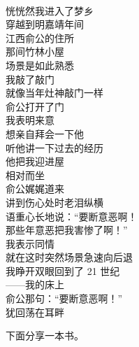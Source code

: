\begin{poem}[梦遇俞公记]
    \begin{multicols}{3}
        \begin{center}~\\
            恍恍然我进入了梦乡 \\ 穿越到明嘉靖年间 \\ 江西俞公的住所 \\ 那间竹林小屋 \\ 场景是如此熟悉 \\ 我敲了敲门 \\ 就像当年灶神敲门一样 \\ 俞公打开了门 \\ 我表明来意 \\ 想亲自拜会一下他 \\ 听他讲一下过去的经历 \\ 他把我迎进屋 \\ 相对而坐 \\ 俞公娓娓道来 \\ 讲到伤心处时老泪纵横 \\ 语重心长地说：“要断意恶啊！ \\ 那些年意恶把我害惨了啊！” \\ 我表示同情 \\ 就在这时突然场景急速向后退 \\ 我睁开双眼回到了 21 世纪 \\ ——我的床上 \\ 俞公那句：“要断意恶啊！” \\ 犹回荡在耳畔
        \end{center}
    \end{multicols}
\end{poem}

下面分享一本书。

